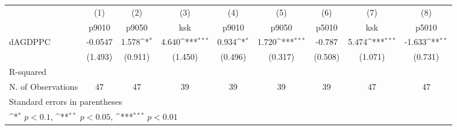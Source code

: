 {
\def\sym#1{\ifmmode^{#1}\else\(^{#1}\)\fi}
\begin{tabular}{l*{8}{c}}
\hline\hline
            &\multicolumn{1}{c}{(1)}&\multicolumn{1}{c}{(2)}&\multicolumn{1}{c}{(3)}&\multicolumn{1}{c}{(4)}&\multicolumn{1}{c}{(5)}&\multicolumn{1}{c}{(6)}&\multicolumn{1}{c}{(7)}&\multicolumn{1}{c}{(8)}\\
            &\multicolumn{1}{c}{p9010}&\multicolumn{1}{c}{p9050}&\multicolumn{1}{c}{ksk}&\multicolumn{1}{c}{p9010}&\multicolumn{1}{c}{p9050}&\multicolumn{1}{c}{p5010}&\multicolumn{1}{c}{ksk}&\multicolumn{1}{c}{p5010}\\
\hline
dAGDPPC     &     -0.0547         &       1.578\sym{*}  &       4.640\sym{***}&       0.934\sym{*}  &       1.720\sym{***}&      -0.787         &       5.474\sym{***}&      -1.633\sym{**} \\
            &     (1.493)         &     (0.911)         &     (1.450)         &     (0.496)         &     (0.317)         &     (0.508)         &     (1.071)         &     (0.731)         \\
\hline
R-squared   &                     &                     &                     &                     &                     &                     &                     &                     \\
N. of Observations &          47         &          47         &          39         &          39         &          39         &          39         &          47         &          47         \\
\hline\hline
\multicolumn{9}{l}{\footnotesize Standard errors in parentheses}\\
\multicolumn{9}{l}{\footnotesize \sym{*} \(p<0.1\), \sym{**} \(p<0.05\), \sym{***} \(p<0.01\)}\\
\end{tabular}
}
